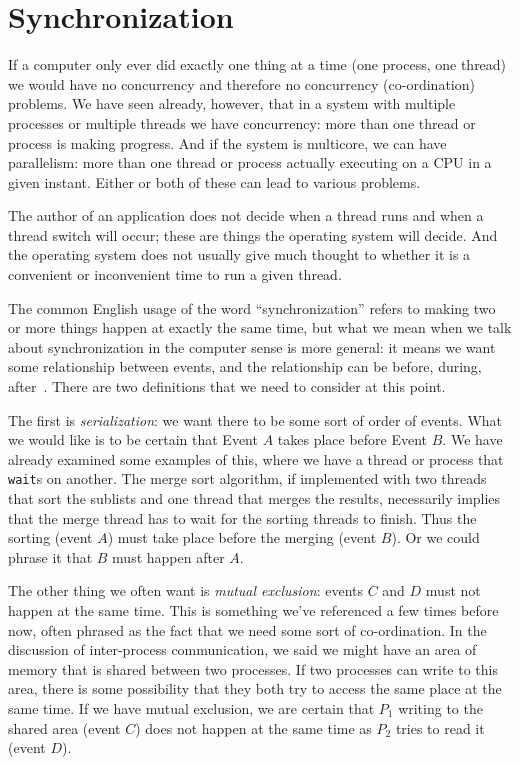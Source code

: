 




\section*{Synchronization}
If a computer only ever did exactly one thing at a time (one process, one thread) we would have no concurrency and therefore no concurrency (co-ordination) problems. We have seen already, however, that in a system with multiple processes or multiple threads we have concurrency: more than one thread or process is making progress. And if the system is multicore, we can have parallelism: more than one thread or process actually executing on a CPU in a given instant. Either or both of these can lead to various problems.

The author of an application does not decide when a thread runs and when a thread switch will occur; these are things the operating system will decide. And the operating system does not usually give much thought to whether it is a convenient or inconvenient time to run a given thread.

The common English usage of the word ``synchronization'' refers to making two or more things happen at exactly the same time, but what we mean when we talk about synchronization in the computer sense is more general: it means we want some relationship between events, and the relationship can be before, during, after~\cite{lbs}. There are two definitions that we need to consider at this point.

The first is \textit{serialization}: we want there to be some sort of order of events. What we would like is to be certain that Event $A$ takes place before Event $B$. We have already examined some examples of this, where we have a thread or process that \texttt{wait}s on another. The merge sort algorithm, if implemented with two threads that sort the sublists and one thread that merges the results, necessarily implies that the merge thread has to wait for the sorting threads to finish. Thus the sorting (event $A$) must take place before the merging (event $B$). Or we could phrase it that $B$ must happen after $A$.

The other thing we often want is \textit{mutual exclusion}: events $C$ and $D$ must not happen at the same time. This is something we've referenced a few times before now, often phrased as the fact that we need some sort of co-ordination. In the discussion of inter-process communication, we said we might have an area of memory that is shared between two processes. If two processes can write to this area, there is some possibility that they both try to access the same place at the same time. If we have mutual exclusion, we are certain that $P_{1}$ writing to the shared area (event $C$) does not happen at the same time as $P_{2}$ tries to read it (event $D$).



